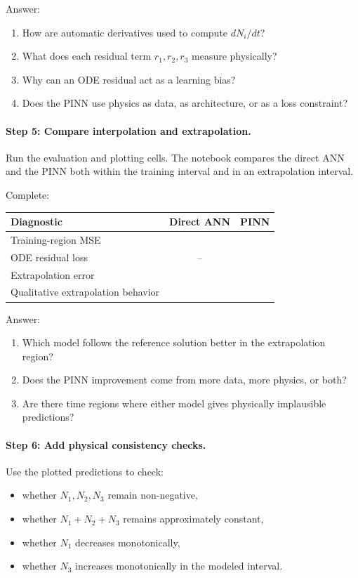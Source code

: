\documentclass[11pt]{article}
\begin{document}
Answer:
\begin{enumerate}
    \item How are automatic derivatives used to compute \(dN_i/dt\)?
    \item What does each residual term \(r_1,r_2,r_3\) measure physically?
    \item Why can an ODE residual act as a learning bias?
    \item Does the PINN use physics as data, as architecture, or as a loss constraint?
\end{enumerate}

\paragraph{Step 5: Compare interpolation and extrapolation.}
Run the evaluation and plotting cells. The notebook compares the direct ANN and the PINN both within the training interval and in an extrapolation interval.

Complete:
\begin{center}
\begin{tabular}{l c c}
\hline
Diagnostic & Direct ANN & PINN \\
\hline
Training-region MSE & & \\
ODE residual loss & -- & \\
Extrapolation error & & \\
Qualitative extrapolation behavior & & \\
\hline
\end{tabular}
\end{center}

Answer:
\begin{enumerate}
    \item Which model follows the reference solution better in the extrapolation region?
    \item Does the PINN improvement come from more data, more physics, or both?
    \item Are there time regions where either model gives physically implausible predictions?
\end{enumerate}

\paragraph{Step 6: Add physical consistency checks.}
Use the plotted predictions to check:
\begin{itemize}
    \item whether \(N_1,N_2,N_3\) remain non-negative,
    \item whether \(N_1+N_2+N_3\) remains approximately constant,
    \item whether \(N_1\) decreases monotonically,
    \item whether \(N_3\) increases monotonically in the modeled interval.
\end{itemize}
\end{document}
